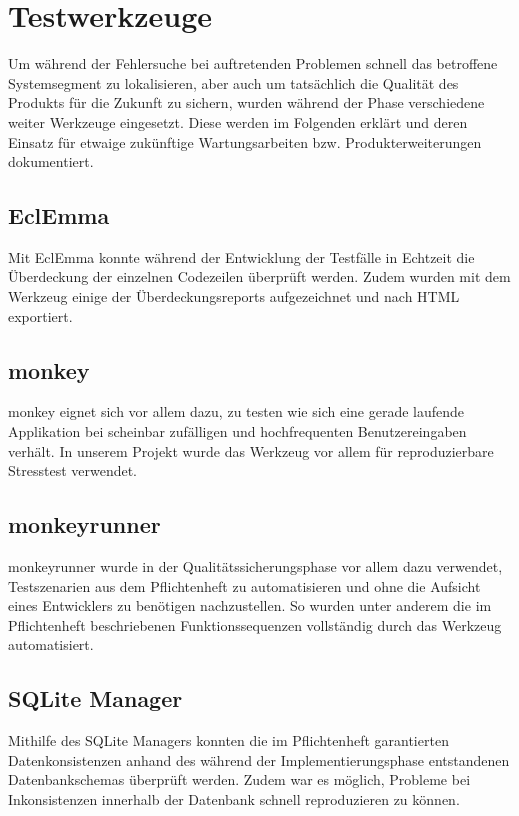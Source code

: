 \chapter{Testwerkzeuge}
Um während der Fehlersuche bei auftretenden Problemen schnell das betroffene Systemsegment zu lokalisieren, aber auch um tatsächlich die Qualität des Produkts für die Zukunft zu sichern, wurden während der Phase verschiedene weiter Werkzeuge eingesetzt.
Diese werden im Folgenden erklärt und deren Einsatz für etwaige zukünftige Wartungsarbeiten bzw. Produkterweiterungen dokumentiert.

\section{EclEmma}
Mit EclEmma konnte während der Entwicklung der Testfälle in Echtzeit die Überdeckung der einzelnen Codezeilen überprüft werden.
Zudem wurden mit dem Werkzeug einige der Überdeckungsreports aufgezeichnet und nach HTML exportiert.

\section{monkey}
monkey eignet sich vor allem dazu, zu testen wie sich eine gerade laufende Applikation bei scheinbar zufälligen und hochfrequenten Benutzereingaben verhält.
In unserem Projekt wurde das Werkzeug vor allem für reproduzierbare Stresstest verwendet.

\section{monkeyrunner}
monkeyrunner wurde in der Qualitätssicherungsphase vor allem dazu verwendet, Testszenarien aus dem Pflichtenheft zu automatisieren und ohne die Aufsicht eines Entwicklers zu benötigen nachzustellen.
So wurden unter anderem die im Pflichtenheft beschriebenen Funktionssequenzen vollständig durch das Werkzeug automatisiert.

\section{SQLite Manager}
Mithilfe des SQLite Managers konnten die im Pflichtenheft garantierten Datenkonsistenzen anhand des während der Implementierungsphase entstandenen Datenbankschemas überprüft werden.
Zudem war es möglich, Probleme bei Inkonsistenzen innerhalb der Datenbank schnell reproduzieren zu können.
